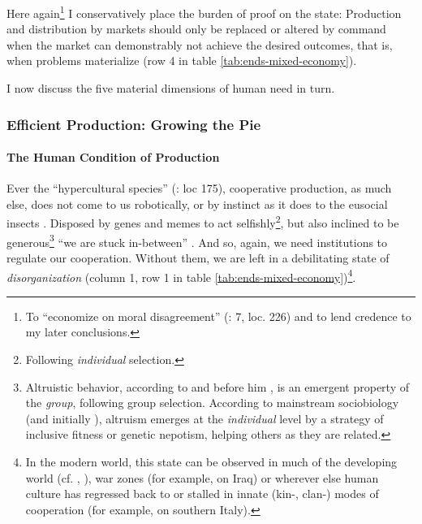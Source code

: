 Here again\footnote
	{To ``economize on moral disagreement'' (\citealt{GutmannThompson-2004-aa}: 7,  loc. 226) and to lend credence to my later conclusions.}
I conservatively place the burden of proof on the state: Production and distribution by markets should only be replaced or altered by command when the market can demonstrably not achieve the desired outcomes, that is, when problems materialize (row 4 in table \ref{tab:ends-mixed-economy}).

I now discuss the five material dimensions of human need in turn.

\subsubsection[Efficient Production]{Efficient Production: Growing the Pie}\label{sec:production}

\paragraph{The Human Condition of Production} \label{sec:human-condition-of-production}
Ever the ``hypercultural species'' (\citealt{Henrich2007}: loc 175), cooperative production, as much else, does not come to us robotically, or by instinct as it does to the eusocial insects \citep{Wilson2012}. Disposed by genes and memes to act selfishly\footnote
	{Following \emph{individual} selection.},
but also inclined to be generous\footnote
	{Altruistic behavior, according to \cite{Wilson2012} and before him \cite{Darwin1859}, is an emergent property of the \emph{group}, following group selection. According to mainstream sociobiology (and initially \citealt{Wilson1975}), altruism emerges at the \emph{individual} level by a strategy of inclusive fitness or genetic nepotism, helping others as they are related.}
``we are stuck in-between'' \citep{Lehrer2012}. And so, again, we need institutions to regulate our cooperation. Without them, we are left in a debilitating state of \emph{disorganization} (column 1, row 1 in table \ref{tab:ends-mixed-economy})\footnote
	{In the modern world, this state can be observed in much of the developing world (cf. \citealt{Clark2007}, \citealt{Easterly-2006-aa}), war zones (for example, \citealt{Baker-IIIHamilton-2006-aa} on Iraq) or wherever else human culture has regressed back to or stalled in innate (kin-, clan-) modes of cooperation (for example, \citealt{PutnamLeonardi-1993-aa} on southern Italy).}.

